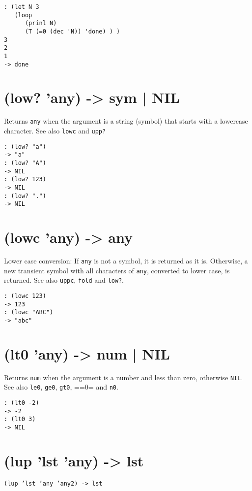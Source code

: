 {{{{{{\begin{verbatim}
: (let N 3
   (loop
      (prinl N)
      (T (=0 (dec 'N)) 'done) ) )
3
2
1
-> done
\end{verbatim}

 
\section{(low? 'any) -> sym | NIL}
\label{sec-8-1-12-30}


Returns \texttt{any} when the argument is a string (symbol) that starts with a
lowercase character. See also \texttt{lowc} and \texttt{upp?}


\begin{verbatim}
: (low? "a")
-> "a"
: (low? "A")
-> NIL
: (low? 123)
-> NIL
: (low? ".")
-> NIL
\end{verbatim}

 
\section{(lowc 'any) -> any}
\label{sec-8-1-12-31}


Lower case conversion: If \texttt{any} is not a symbol, it is returned as it
is. Otherwise, a new transient symbol with all characters of \texttt{any},
converted to lower case, is returned. See also \texttt{uppc}, \texttt{fold} and
\texttt{low?}.


\begin{verbatim}
: (lowc 123)
-> 123
: (lowc "ABC")
-> "abc"
\end{verbatim}

 
\section{(lt0 'any) -> num | NIL}
\label{sec-8-1-12-32}


Returns \texttt{num} when the argument is a number and less than zero,
otherwise \texttt{NIL}. See also \texttt{le0}, \texttt{ge0}, \texttt{gt0}, ==0= and \texttt{n0}.


\begin{verbatim}
: (lt0 -2)
-> -2
: (lt0 3)
-> NIL
\end{verbatim}

 
\section{(lup 'lst 'any) -> lst}
\label{sec-8-1-12-33}


\texttt{(lup 'lst 'any 'any2) -> lst}

}}}}}}
